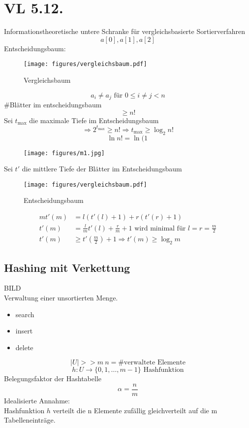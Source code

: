 \documentclass[a4paper,draft,twoside,10pt]{report}
\begin{document}
\chapter{VL 5.12.}
Informationstheoretische untere Schranke für vergleichsbasierte Sortierverfahren\\
\[a[0],a[1],a[2]\]
Entscheidungsbaum:
\begin{figure}[H]\center
\texttt{[image: figures/vergleichsbaum.pdf]}
\caption{Vergleichsbaum}
\end{figure}
\[a_i\ne a_j \mbox{ für }0\le i\ne j<n\]
\#Blätter im entscheidungsbaum\[\ge n!\]
Sei $t_{\max} $ die maximale Tiefe im Entscheidungsbaum
\[\Rightarrow 2^{t_{\max}}\ge n! \Rightarrow t_{\max} \ge \log_2n!\]
\[\ln n! = \ln (1\,\]

\begin{figure}[H]\center
\texttt{[image: figures/m1.jpg]}
\end{figure}

Sei $t'$ die mittlere Tiefe der Blätter im Entscheidungsbaum
\begin{figure}[H]\center
\texttt{[image: figures/vergleichsbaum.pdf]}
\caption{Entscheidungsbaum}
\end{figure}
\begin{align*}
mt'(m)&=l(t'(l)+1)+r(t'(r)+1)\\
t'(m)&=\frac{l}{m}t'(l)+\frac{r}{m}+1 \mbox{ wird minimal für } l=r=\frac{m}{2}\\
t'(m)&\ge t'(\frac{m}{2})+1 \Rightarrow t'(m)\ge\log_2m\end{align*}

\section{Hashing mit Verkettung}
BILD\\
Verwaltung einer unsortierten Menge.
\begin{itemize}
\item search
\item insert
\item delete
\end{itemize}
\[|U|>>m~n=\#\mbox{verwaltete Elemente}\]
\[h:U\rightarrow\{0,1,\hdots,m-1\}\mbox{ Hashfunktion}\]
Belegungsfaktor der Hashtabelle
\[\alpha =\frac{n}{m}\]
Idealisierte Annahme:\\
Hashfunktion $h$ verteilt die n Elemente zufällig gleichverteilt auf die m Tabelleneinträge.
\end{document}
